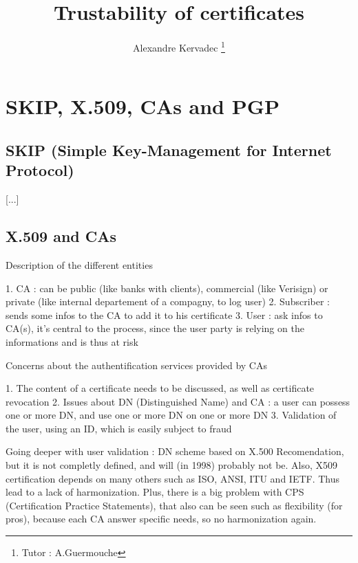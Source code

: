 \documentclass[journal, a4paper]{IEEEtran}
\begin{document}
	\title{Trustability of certificates}
	\author{Alexandre Kervadec
	\thanks{Tutor : A.Guermouche}}
	\maketitle

\begin{abstract}
	
\end{abstract}

\section{SKIP, X.509, CAs and PGP}

\subsection{SKIP (Simple Key-Management for Internet Protocol)}

[...]

\subsection{X.509 and CAs}

Description of the different entities

1. CA : can be public (like banks with clients), commercial (like Verisign) or private (like internal departement of a compagny, to log user)
2. Subscriber : sends some infos to the CA to add it to his certificate
3. User : ask infos to CA(s), it's central to the process, since the user party is relying on the informations and is thus at risk

Concerns about the authentification services provided by CAs

1. The content of a certificate needs to be discussed, as well as certificate revocation
2. Issues about DN (Distinguished Name) and CA : a user can possess one or more DN, and use one or more DN on one or more DN
3. Validation of the user, using an ID, which is easily subject to fraud

Going deeper with user validation : DN scheme based on X.500 Recomendation, but it is not completly defined, and will (in 1998) probably not be. Also, X509 certification depends on many others such as ISO, ANSI, ITU and IETF. Thus lead to a lack of harmonization.
Plus, there is a big problem with CPS (Certification Practice Statements), that also can be seen such as flexibility (for pros), because each CA answer specific needs, so no harmonization again.
\end{document}

